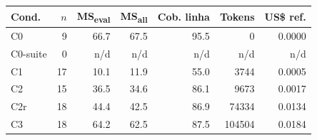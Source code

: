 \begin{tabular}{lrrrrrr}
\toprule
Cond. & $n$ & MS\textsubscript{eval} & MS\textsubscript{all} & Cob. linha & Tokens & US\$ ref. \\
\midrule
C0 & 9 & 66.7 & 67.5 & 95.5 & 0 & 0.0000 \\
C0-suite & 0 & n/d & n/d & n/d & n/d & n/d \\
C1 & 17 & 10.1 & 11.9 & 55.0 & 3744 & 0.0005 \\
C2 & 15 & 36.5 & 34.6 & 86.1 & 9673 & 0.0017 \\
C2r & 18 & 44.4 & 42.5 & 86.9 & 74334 & 0.0134 \\
C3 & 18 & 64.2 & 62.5 & 87.5 & 104504 & 0.0184 \\
\bottomrule
\end{tabular}
